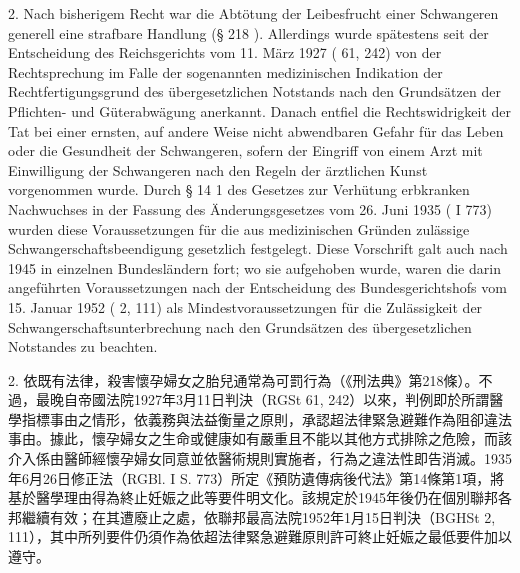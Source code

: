 \documentclass[12pt]{article}
\begin{document}
\syncleft
\begin{sourcepara}
2. Nach bisherigem Recht war die Abtötung der Leibesfrucht einer Schwangeren generell eine strafbare Handlung (§ 218 \abbrStGB{}). Allerdings wurde spätestens seit der Entscheidung des Reichsgerichts vom 11. März 1927 (\abbrRGSt{} 61, 242) von der Rechtsprechung im Falle der sogenannten medizinischen Indikation der Rechtfertigungsgrund des übergesetzlichen Notstands nach den Grundsätzen der Pflichten- und Güterabwägung anerkannt. Danach entfiel die Rechtswidrigkeit der Tat bei einer ernsten, auf andere Weise nicht abwendbaren Gefahr für das Leben oder die Gesundheit der Schwangeren, sofern der Eingriff von einem Arzt mit Einwilligung der Schwangeren nach den Regeln der ärztlichen Kunst vorgenommen wurde. Durch § 14 \abbrAbs{} 1 des Gesetzes zur Verhütung erbkranken Nachwuchses in der Fassung des Änderungsgesetzes vom 26. Juni 1935 (\abbrRGBl{} I \abbrS{} 773) wurden diese Voraussetzungen für die aus medizinischen Gründen zulässige Schwangerschaftsbeendigung gesetzlich festgelegt. Diese Vorschrift galt auch nach 1945 in einzelnen Bundesländern fort; wo sie aufgehoben wurde, waren die darin angeführten Voraussetzungen nach der Entscheidung des Bundesgerichtshofs vom 15. Januar 1952 (\abbrBGHSt{} 2, 111) als Mindestvoraussetzungen für die Zulässigkeit der Schwangerschaftsunterbrechung nach den Grundsätzen des übergesetzlichen Notstandes zu beachten.
\end{sourcepara}
\begin{transpara}
2. 依既有法律，殺害懷孕婦女之胎兒通常為可罰行為（《刑法典》第218條）。不過，最晚自帝國法院1927年3月11日判決（RGSt 61, 242）以來，判例即於所謂醫學指標事由之情形，依義務與法益衡量之原則，承認超法律緊急避難作為阻卻違法事由。據此，懷孕婦女之生命或健康如有嚴重且不能以其他方式排除之危險，而該介入係由醫師經懷孕婦女同意並依醫術規則實施者，行為之違法性即告消滅。1935年6月26日修正法（RGBl. I S. 773）所定《預防遺傳病後代法》第14條第1項，將基於醫學理由得為終止妊娠之此等要件明文化。該規定於1945年後仍在個別聯邦各邦繼續有效；在其遭廢止之處，依聯邦最高法院1952年1月15日判決（BGHSt 2, 111），其中所列要件仍須作為依超法律緊急避難原則許可終止妊娠之最低要件加以遵守。
\end{transpara}
\end{document}
